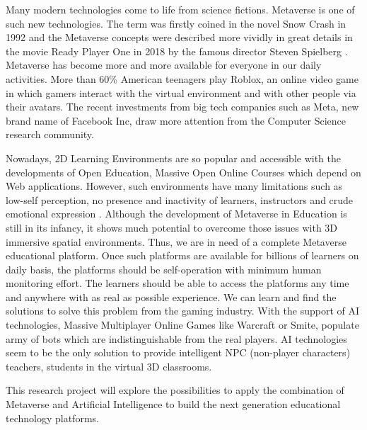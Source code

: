 \documentclass[
    ngerman,american
    ]{scrartcl}
\begin{document}
        \sectionIntroduction
        Many modern technologies come to life from science fictions. Metaverse is one of such new technologies. 
        The term was firstly coined in the novel Snow Crash in 1992 
        and the Metaverse concepts were described more vividly in great details in the movie Ready Player One 
        in 2018 by the famous director Steven Spielberg \cite{mystakidis_meta_encyclopedia_2022} \cite{park_meta_taxonomy_2022}. 
        Metaverse has become more and more available for everyone in our daily activities. More than 60\% American teenagers play Roblox, 
        an online video game in which gamers interact with the virtual environment and with other people via 
        their avatars. The recent investments from big tech companies such as Meta, new brand name of Facebook Inc, 
        draw more attention from the Computer Science research community.
        \par
        Nowadays, 2D Learning Environments are so popular and accessible with the developments of Open Education, Massive Open Online Courses which
        depend on Web applications. However, such environments have many limitations
        such as low-self perception, no presence and inactivity of learners, instructors and crude emotional expression  \cite{mystakidis_meta_encyclopedia_2022}. 
        Although the development of Metaverse in Education is still in its infancy, it shows much potential to overcome those issues
        with 3D immersive spatial environments. 
        Thus, we are in need of a complete Metaverse educational platform.
        Once such platforms are available for billions of learners on daily basis, the platforms 
        should be self-operation with minimum human monitoring effort. The learners should be able to access
        the platforms any time and anywhere with as real as possible experience. We can learn and find the solutions 
        to solve this problem from the gaming industry. With the support of AI technologies, Massive Multiplayer Online Games 
        like Warcraft or Smite, populate army of bots which are indistinguishable from the real players.  AI technologies 
        seem to be the only solution to provide intelligent NPC (non-player characters) teachers, students in the virtual 3D classrooms.         
        \par
        This research project will explore the possibilities to apply the combination of Metaverse and Artificial Intelligence 
        to build the next generation educational technology platforms.                
        
\end{document}
